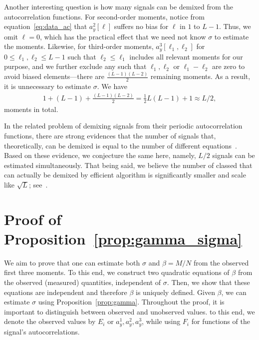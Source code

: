 \documentclass[english,11pt]{article}
\numberwithin{equation}{section}
\theoremstyle{plain}
\theoremstyle{definition}
\theoremstyle{remark}
\theoremstyle{plain}
\theoremstyle{remark}
\theoremstyle{plain}
\theoremstyle{plain}
\begin{document}
Another interesting question is how many signals can be demixed from the autocorrelation functions.
For second-order moments, notice from equation~\eqref{eq:data_ac} that $a_y^2[\ell]$ suffers no bias for $\ell$ in $1$ to $L-1$. Thus, we omit $\ell = 0$, which has the practical effect that we need not know $\sigma$ to estimate the moments. Likewise, for third-order moments, $a_y^3[\ell_1, \ell_2]$ for $0 \leq \ell_1, \ell_2 \leq L-1$ such that $\ell_2 \leq \ell_1$ includes all relevant moments for our purpose, and we further exclude any such that $\ell_1, \ell_2$ or $\ell_1 - \ell_2$ are zero to avoid biased elements---there are $\frac{(L-1)(L-2)}{2}$ remaining moments. As a result, it is unnecessary to estimate $\sigma$. We have 
\begin{align*}
1 + (L-1) + \frac{(L-1)(L-2)}{2} = \frac{1}{2} L (L-1) + 1 \approx L/2,
\end{align*}
moments in total.

In the related problem of demixing signals from their periodic autocorrelation functions, there are strong evidences that the number of signals that, theoretically, can be demixed is equal to the number of different equations~\cite{bandeira2017estimation}. Based on these evidence, we conjecture the same here, namely, $L/2$ signals can be estimated simultaneously.  That being said, we believe the number of classed that can actually be demixed by efficient algorithm is significantly smaller  and scale like $\sqrt{L}$; see~\cite{boumal2017heterogeneous,weinthesis}.

\section{Proof of Proposition~\ref{prop:gamma_sigma}} \label{sec:proof_prop_gamma_sigma}

We aim to prove that one can estimate both $\sigma$ and $\beta = M/N$ from the observed first three moments.
To this end, we construct two quadratic equations of $\beta$ from the observed (measured) quantities, independent of $\sigma$.
Then, we show that these equations are independent and therefore $\beta$ is uniquely defined. 
Given $\beta$, we can estimate $\sigma$ using Proposition~\ref{prop:gamma}.
Throughout the proof, it is important to distinguish between observed and unobserved values. 
to this end, we denote the observed values by $E_i$ or $a_y^1,a_y^2,a_y^3$, while using $F_i$ for functions of the signal's autocorrelations. 
\end{document}
